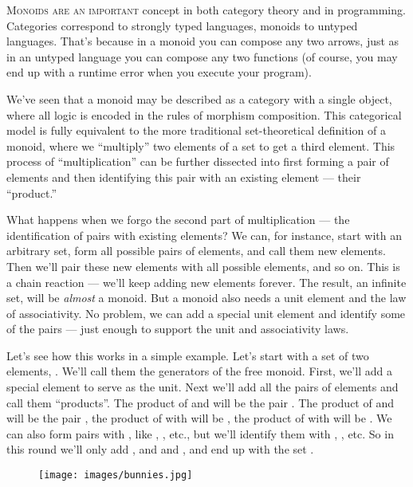 \lettrine[lhang=0.17]{M}{onoids are an important} concept in both category theory and in
programming. Categories correspond to strongly typed languages, monoids
to untyped languages. That's because in a monoid you can compose any two
arrows, just as in an untyped language you can compose any two functions
(of course, you may end up with a runtime error when you execute your
program).

We've seen that a monoid may be described as a category with a single
object, where all logic is encoded in the rules of morphism composition.
This categorical model is fully equivalent to the more traditional
set-theoretical definition of a monoid, where we ``multiply'' two
elements of a set to get a third element. This process of
``multiplication'' can be further dissected into first forming a pair of
elements and then identifying this pair with an existing element ---
their ``product.''

What happens when we forgo the second part of multiplication --- the
identification of pairs with existing elements? We can, for instance,
start with an arbitrary set, form all possible pairs of elements, and
call them new elements. Then we'll pair these new elements with all
possible elements, and so on. This is a chain reaction --- we'll keep
adding new elements forever. The result, an infinite set, will be
\emph{almost} a monoid. But a monoid also needs a unit element and the
law of associativity. No problem, we can add a special unit element and
identify some of the pairs --- just enough to support the unit and
associativity laws.

Let's see how this works in a simple example. Let's start with a set of
two elements, . We'll call them the generators of the
free monoid. First, we'll add a special element  to serve as
the unit. Next we'll add all the pairs of elements and call them
``products''. The product of  and  will be the pair
. The product of  and  will be the
pair , the product of  with  will be
, the product of  with  will be
. We can also form pairs with , like
, , etc., but we'll identify them with
, , etc. So in this round we'll only add
,  and  and
, and end up with the set
.

\begin{figure}[H]
\centering
\texttt{[image: images/bunnies.jpg]}
\end{figure}

